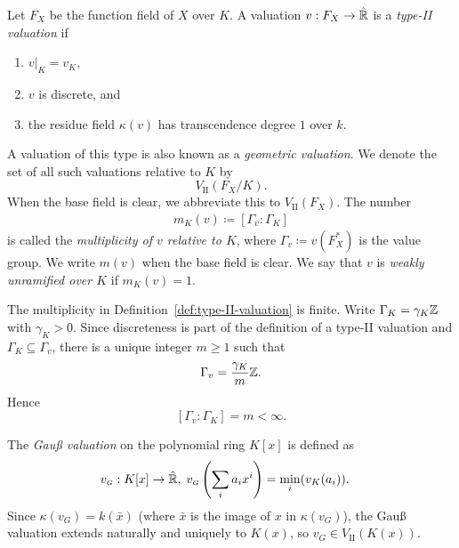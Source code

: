 \begin{definition}\label{def:type-II-valuation}
    Let $F_X$ be the function field of $X$ over $K$.
    A valuation $v: F_X \to \hat{\mathbb R}$ is a \textit{type-II valuation} if
    \begin{enumerate}[label=\textup{(\alph*)}]
        \item $v|_K = v_K$,
        \item $v$ is discrete, and
        \item the residue field $\kappa(v)$ has transcendence degree $1$ over $k$.
    \end{enumerate}
    A valuation of this type is also known as a \textit{geometric valuation}.
    We denote the set of all such valuations relative to $K$ by
    \[
        V_\mathrm{II}(F_X/K).
    \]
    When the base field is clear, we abbreviate this to $V_\mathrm{II}(F_X)$.
    The number
    \begin{align}
        m_K(v) \coloneqq [\Gamma_v : \Gamma_K]
    \end{align}
    is called the \textit{multiplicity of $v$ relative to $K$}, where $\Gamma_v \coloneqq v(F_X^*)$ is the value group.
    We write $m(v)$ when the base field is clear.
    We say that $v$ is \textit{weakly unramified over $K$} if $m_K(v) = 1$.
\end{definition}

\begin{remark}\label{rem:type-II-multiplicity-finite}
    The multiplicity in Definition~\ref{def:type-II-valuation} is finite.
    Write $\Gamma_K=\gamma_K\mathbb Z$ with $\gamma_K>0$.
    Since discreteness is part of the definition of a type-II valuation and $\Gamma_K\subseteq\Gamma_v$, there is a unique integer $m\geq1$ such that
    \[
        \Gamma_v=\frac{\gamma_K}{m}\mathbb Z.
    \]
    Hence
    \[
        [\Gamma_v:\Gamma_K]=m<\infty.
    \]
\end{remark}

\begin{example}
    The \textit{Gauß valuation} on the polynomial ring $K[x]$ is defined as
    \begin{align}
        v_{\scriptscriptstyle G}: K[x] &\to \hat{\mathbb R}, \; v_{\scriptscriptstyle G}\left( \sum_i a_i x^{i} \right) = \min_i(v_K(a_i)).
    \end{align}
    Since $\kappa(v_{\scriptscriptstyle G}) = k(\bar{x})$ (where $\bar{x}$ is the image of $x$ in $\kappa(v_{\scriptscriptstyle G})$), the Gauß valuation
    extends naturally and uniquely to $K(x)$, so $v_{\scriptscriptstyle G} \in V_\textrm{II}(K(x))$.
\end{example}

